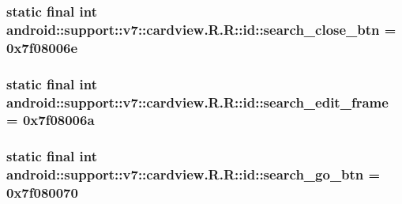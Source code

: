 \hypertarget{classandroid_1_1support_1_1v7_1_1cardview_1_1_r_1_1id_66dfd66f2784f8ac11560f849e916860}{
\subsubsection[{search\_\-close\_\-btn}]{\setlength{\rightskip}{0pt plus 5cm}static final int android::support::v7::cardview.R.R::id::search\_\-close\_\-btn = 0x7f08006e}}
\label{classandroid_1_1support_1_1v7_1_1cardview_1_1_r_1_1id_66dfd66f2784f8ac11560f849e916860}


\hypertarget{classandroid_1_1support_1_1v7_1_1cardview_1_1_r_1_1id_cdcd1faf07234c23e78ff9e0a8ead7ea}{
\subsubsection[{search\_\-edit\_\-frame}]{\setlength{\rightskip}{0pt plus 5cm}static final int android::support::v7::cardview.R.R::id::search\_\-edit\_\-frame = 0x7f08006a}}
\label{classandroid_1_1support_1_1v7_1_1cardview_1_1_r_1_1id_cdcd1faf07234c23e78ff9e0a8ead7ea}


\hypertarget{classandroid_1_1support_1_1v7_1_1cardview_1_1_r_1_1id_114052ec459693b90d0ca9a2bfab05f0}{
\subsubsection[{search\_\-go\_\-btn}]{\setlength{\rightskip}{0pt plus 5cm}static final int android::support::v7::cardview.R.R::id::search\_\-go\_\-btn = 0x7f080070}}
\label{classandroid_1_1support_1_1v7_1_1cardview_1_1_r_1_1id_114052ec459693b90d0ca9a2bfab05f0}


